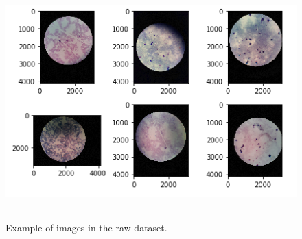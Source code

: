 \documentclass{article}
\begin{document}
\begin{figure}[hbt!]
\includegraphics[height=9cm, width=13cm]{image_samples.png}
\caption{Example of images in the raw dataset.}
\label{fig:img_samples}
\end{figure}



\end{document}
